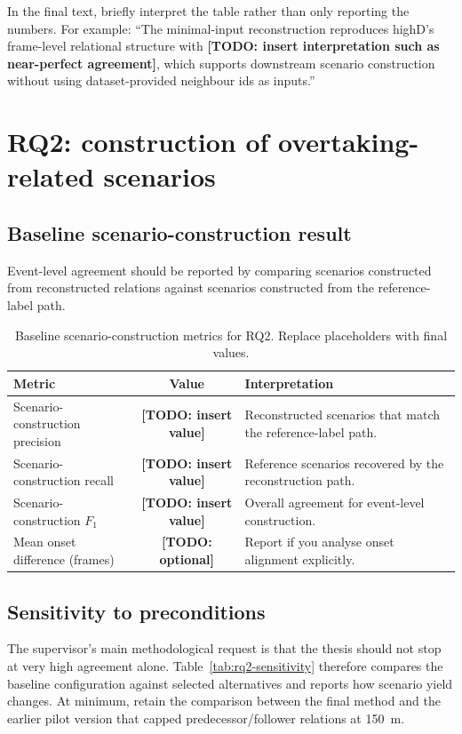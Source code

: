 \documentclass[12pt,a4paper,twoside,openright]{report}
\newcommand{\TODO}[1]{\textbf{[TODO: #1]}}
\begin{document}
    In the final text, briefly interpret the table rather than only reporting the numbers. For example: ``The minimal-input reconstruction reproduces highD's frame-level relational structure with \TODO{insert interpretation such as near-perfect agreement}, which supports downstream scenario construction without using dataset-provided neighbour ids as inputs.''

    \section{RQ2: construction of overtaking-related scenarios}
    \subsection{Baseline scenario-construction result}
    Event-level agreement should be reported by comparing scenarios constructed from reconstructed relations against scenarios constructed from the reference-label path.

    \begin{table}[H]
        \centering
        \caption{Baseline scenario-construction metrics for RQ2. Replace placeholders with final values.}
        \label{tab:rq2-baseline}
        {\small
        \setlength{\tabcolsep}{4pt}
            \begin{tabularx}{\textwidth}{@{}l c X@{}}
\toprule
Metric & Value & Interpretation \\
\midrule
Scenario-construction precision & \TODO{insert value} & Reconstructed scenarios that match the reference-label path. \\
Scenario-construction recall & \TODO{insert value} & Reference scenarios recovered by the reconstruction path. \\
Scenario-construction $F_1$ & \TODO{insert value} & Overall agreement for event-level construction. \\
Mean onset difference (frames) & \TODO{optional} & Report if you analyse onset alignment explicitly. \\
\bottomrule
            \end{tabularx}}
    \end{table}

    \subsection{Sensitivity to preconditions}
    The supervisor's main methodological request is that the thesis should not stop at very high agreement alone. Table~\ref{tab:rq2-sensitivity} therefore compares the baseline configuration against selected alternatives and reports how scenario yield changes. At minimum, retain the comparison between the final method and the earlier pilot version that capped predecessor/follower relations at \SI{150}{\meter}.
\end{document}
